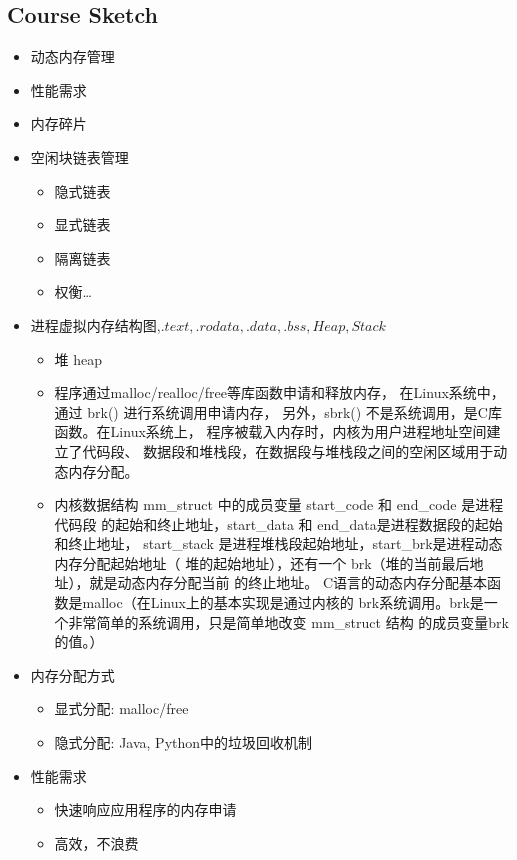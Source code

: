 \documentclass[a4paper, 11pt]{article}
\begin{document}
\subsection{Course Sketch}
\begin{itemize}
  \item{动态内存管理}
  \item{性能需求}
  \item{内存碎片}
  \item{空闲块链表管理}
	\begin{itemize}
	  \item{隐式链表}
	  \item{显式链表}
	  \item{隔离链表}
	  \item{权衡\dots}
	  \end{itemize}
	\item{进程虚拟内存结构图,$.text, .rodata, .data, .bss, Heap, Stack$}
	  \begin{itemize}
		\item{堆 heap}
		\item{程序通过malloc/realloc/free等库函数申请和释放内存，
		  在Linux系统中，通过 brk() 进行系统调用申请内存，
		  另外，sbrk() 不是系统调用，是C库函数。在Linux系统上，
		  程序被载入内存时，内核为用户进程地址空间建立了代码段、
		  数据段和堆栈段，在数据段与堆栈段之间的空闲区域用于动态内存分配。}
		\item{内核数据结构 mm\_struct 中的成员变量 start\_code 和 end\_code 是进程代码段
		  的起始和终止地址，start\_data 和 end\_data是进程数据段的起始和终止地址，
		  start\_stack 是进程堆栈段起始地址，start\_brk是进程动态内存分配起始地址（
		  堆的起始地址），还有一个 brk（堆的当前最后地址），就是动态内存分配当前
		  的终止地址。
		  C语言的动态内存分配基本函数是malloc（在Linux上的基本实现是通过内核的
		  brk系统调用。brk是一个非常简单的系统调用，只是简单地改变 mm\_struct 结构
		  的成员变量brk的值。）}
		\end{itemize}
	  \item{内存分配方式}
		\begin{itemize}
		  \item{显式分配: malloc/free}
		  \item{隐式分配: Java, Python中的垃圾回收机制}
		  \end{itemize}
		\item{性能需求}
		  \begin{itemize}
			\item{快速响应应用程序的内存申请}
			\item{高效，不浪费}

\end{itemize}
\end{itemize}
\end{document}
